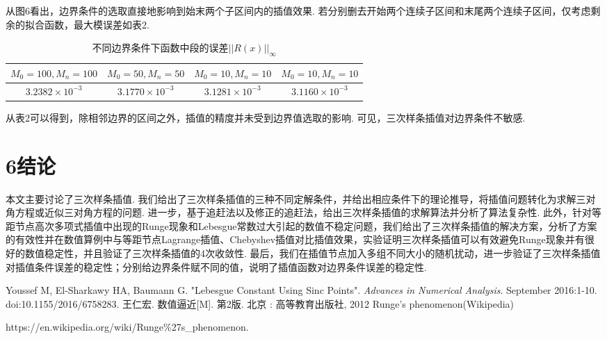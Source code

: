 \documentclass[12pt]{article}
\begin{document}
\par 从图6看出，边界条件的选取直接地影响到始末两个子区间内的插值效果. 若分别删去开始两个连续子区间和末尾两个连续子区间，仅考虑剩余的拟合函数，最大模误差如表2.

\begin{table}[h]
	\centering
	\setlength{\abovecaptionskip}{10pt}
	\caption{不同边界条件下函数中段的误差$||R(x)||_{\infty}$}
	\begin{tabular}{cccc}
	\hline
	$M_{0}=100,M_{n}=100$& $M_{0}=50,M_{n}=50$& $M_{0}=10,M_{n}=10$& $M_{0}=10,M_{n}=10$\\
	\hline
	$3.2382\times10^{-3}$& $3.1770\times10^{-3}$& 
	$3.1281\times10^{-3}$& $3.1160\times10^{-3}$\\
	\hline
	\end{tabular}
\end{table}

\par 从表2可以得到，除相邻边界的区间之外，插值的精度并未受到边界值选取的影响. 可见，三次样条插值对边界条件不敏感.

\section*{{\large\bf 6}\quad\large\heiti  结论}
\par 本文主要讨论了三次样条插值. 我们给出了三次样条插值的三种不同定解条件，并给出相应条件下的理论推导，将插值问题转化为求解三对角方程或近似三对角方程的问题. 进一步，基于追赶法以及修正的追赶法，给出三次样条插值的求解算法并分析了算法复杂性. 此外，针对等距节点高次多项式插值中出现的Runge现象和Lebesgue常数过大引起的数值不稳定问题，我们给出了三次样条插值的解决方案，分析了方案的有效性并在数值算例中与等距节点Lagrange插值、Chebyshev插值对比插值效果，实验证明三次样条插值可以有效避免Runge现象并有很好的数值稳定性，并且验证了三次样条插值的4次收敛性. 最后，我们在插值节点加入多组不同大小的随机扰动，进一步验证了三次样条插值对插值条件误差的稳定性；分别给边界条件赋不同的值，说明了插值函数对边界条件误差的稳定性.
	
{\footnotesize
\begin{thebibliography}{99}
\setlength{\itemsep}{0pt}
\setlength{\parskip}{0pt}
Youssef M, El-Sharkawy HA, Baumann G. "Lebesgue Constant Using Sinc Points". \textit{Advances in Numerical Analysis}. September 2016:1-10. doi:10.1155/2016/6758283.
王仁宏. 数值逼近[M]. 第2版.  北京 : 高等教育出版社, 2012
Runge's phenomenon(Wikipedia)
\par https://en.wikipedia.org/wiki/Runge\%27s\_phenomenon.

\end{thebibliography}}	


	
\end{document}
